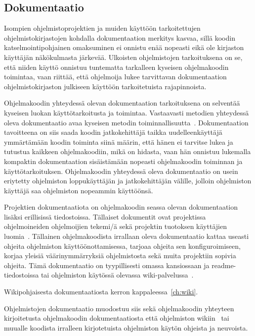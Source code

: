 \documentclass[finnish]{tktltiki2}
\theoremstyle{definition}
\theoremstyle{remark}
\begin{document}
\subsection{Dokumentaatio}

Isompien ohjelmistoprojektien ja muiden käyttöön tarkoitettujen ohjelmistokirjastojen kohdalla dokumentaation merkitys kasvaa, sillä koodin katselmointipohjainen omaksuminen ei onnistu enää nopeasti eikä ole kirjaston käyttäjän näkökulmasta järkevää. Ulkoisten ohjelmistojen tarkoituksena on se, että niiden käyttö onnistuu tuntematta tarkalleen kyseisen ohjelmakoodin toimintaa, vaan riittää, että ohjelmoija lukee tarvittavan dokumentaation ohjelmistokirjaston julkiseen käyttöön tarkoitetuista rajapinnoista.

Ohjelmakoodin yhteydessä olevan dokumentaation tarkoituksena on selventää kyseisen luokan käyttötarkoitusta ja toimintaa. Vastaavasti metodien yhteydessä oleva dokumentaatio avaa kyseisen metodin toiminnallisuutta~\cite{javadoc}.
Dokumentaation tavoitteena on siis saada koodin jatkokehittäjä taikka uudelleenkäyttäjä ymmärtämään koodin toiminta siinä määrin, että hänen ei tarvitse lukea ja tutustua kaikkeen ohjelmakoodiin, mikä on hidasta, vaan hän onnistuu lukemalla kompaktin dokumentaation sisäistämään nopeasti ohjelmakoodin toiminnan ja käyttötarkoituksen. Ohjelmakoodin yhteydessä oleva dokumentaatio on usein eriytetty ohjelmiston loppukäyttäjän ja jatkokehittäjän välille, jolloin ohjelmiston käyttäjä saa ohjelmiston nopeammin käyttöönsä.

Projektien dokumentaatiota on ohjelmakoodin seassa olevan dokumentaation lisäksi erillisissä tiedostoissa. Tällaiset dokumentit ovat projektissa ohjelmoineiden ohjelmoijien tekemi/ä sekä projektin tuotoksen käyttäjien luomia~\cite{using-wikis-in-sw}.
Tällainen ohjelmakoodista irrallaan oleva dokumentaatio kattaa useasti ohjeita ohjelmiston käyttöönottamisessa, tarjoaa ohjeita sen konfiguroimiseen, korjaa yleisiä väärinymmärryksiä ohjelmistosta sekä muita projektiin sopivia ohjeita. Tämä dokumentaatio on tyypillisesti omassa kansiossaan ja readme-tiedostoissa tai ohjelmiston käytössä olevassa wiki-palvelussa~\cite{using-wikis-in-sw}.

Wikipohjaisesta dokumentaatiosta kerron kappaleessa~\ref{ch:wiki}.

Ohjelmistojen dokumentaatio muodostuu siis sekä ohjelmakoodin yhteyteen kirjoitetusta ohjelmakoodin dokumentaatiosta että ohjelmiston wikiin~\cite{using-wikis-in-sw} tai muualle koodista irralleen kirjotetuista ohjelmiston käytön ohjeista ja neuvoista.
\end{document}
